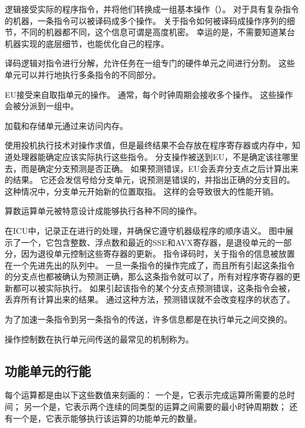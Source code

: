 {{        逻辑接受实际的程序指令，并将他们转换成一组基本操作（）。
        对于具有复杂指令的机器，一条指令可以被译码成多个操作。
        关于指令如何被译码成操作序列的细节，不同的机器都不同，这个信息可谓是高度机密。
        幸运的是，不需要知道某台机器实现的底层细节，也能优化自己的程序。

        译码逻辑对指令进行分解，允许任务在一组专门的硬件单元之间进行分割。
        这些单元可以并行地执行多条指令的不同部分。

        EU接受来自取指单元的操作。
        通常，每个时钟周期会接收多个操作。
        这些操作会被分派到一组中。

        加载和存储单元通过来访问内存。

        使用投机执行技术对操作求值，但是最终结果不会存放在程序寄存器或内存中，知道处理器能确定应该实际执行这些指令。
        分支操作被送到EU，不是确定该往哪里去，而是确定分支预测是否正确。
        如果预测错误，EU会丢弃分支点之后计算出来的结果。
        它还会发信号给分支单元，说预测是错误的，并指出正确的分支目的。
        这种情况中，分支单元开始新的位置取指。
        这样的会导致很大的性能开销。

        算数运算单元被特意设计成能够执行各种不同的操作。

        在ICU中，记录正在进行的处理，并确保它遵守机器级程序的顺序语义。
        图中展示了一个，它包含整数、浮点数和最近的SSE和AVX寄存器，是退役单元的一部分，因为退役单元控制这些寄存器的更新。
        指令译码时，关于指令的信息被放置在一个先进先出的队列中。
        一旦一条指令的操作完成了，而且所有引起这条指令的分支点也都被确认为预测正确，那么这条指令就可以了，所有对程序寄存器的更新都可以被实际执行。
        如果引起该指令的某个分支点预测错误，这条指令会被，丢弃所有计算出来的结果。
        通过这种方法，预测错误就不会改变程序的状态了。

        为了加速一条指令到另一条指令的传送，许多信息都是在执行单元之间交换的。

        操作控制数在执行单元间传送的最常见的机制称为。
    }

    \subsection{功能单元的行能}
    {
        每个运算都是由以下这些数值来刻画的：
        一个是，它表示完成运算所需要的总时间；
        另一个是，它表示两个连续的同类型的运算之间需要的最小时钟周期数；
        还有一个是，它表示能够执行该运算的功能单元的数量。

}}
